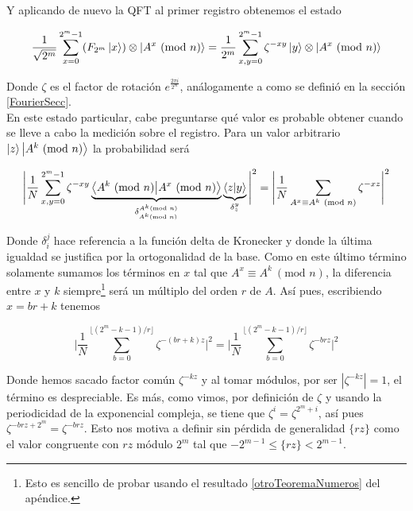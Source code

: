 \documentclass[11pt, spanish]{report}
\numberwithin{equation}{section}
\numberwithin{defin}{section}
\begin{document}
Y aplicando de nuevo la QFT al primer registro obtenemos el estado

\begin{equation}
\frac{1}{\sqrt{2^m}}\sum_{x=0}^{2^m-1} (F_{2^m}\ket{x})\otimes\ket{A^x\ (\text{mod }n)}=\frac{1}{2^m}\sum_{x,y=0}^{2^m-1}\zeta^{-xy}\ket{y}\otimes\ket{A^x\ (\text{mod }n)}
\end{equation}

Donde $\zeta$ es el factor de rotación $e^{\frac{2\pi i}{2^m}}$, análogamente a como se definió en la sección \ref{FourierSecc}.\\

En este estado particular, cabe preguntarse qué valor es probable obtener cuando se lleve a cabo la medición sobre el registro. Para un valor arbitrario $\ket{z}\ket{A^k\ (\text{mod }n)}$ la probabilidad será\footnotemark{}


\begin{equation}
\begin{split}
\Bigg|\frac{1}{N}\sum_{x,y=0}^{2^m-1}\zeta^{-xy}\underbrace{\bra{A^k\ (\text{mod }n)}\ket{A^x\ (\text{mod }n)}}_{\delta_{A^k (\text{mod }n)}^{A^k (\text{mod }n)}}\underbrace{\bra{z}\ket{y}}_{\delta_z^y}\Bigg|^2=\Bigg|\frac{1}{N}\sum_{A^x\equiv A^k\ (\text{mod }n)}\zeta^{-xz}\Bigg|^2
\end{split}
\end{equation}

Donde $\delta_i^j$ hace referencia a la función delta de Kronecker y donde la última igualdad se justifica por la ortogonalidad de la base. Como en este último término solamente sumamos los términos en $x$ tal que $A^x\equiv A^k\ (\text{mod }n)$, la  diferencia entre $x$ y $k$ siempre\footnote{Esto es sencillo de probar usando el resultado \ref{otroTeoremaNumeros} del apéndice.} será un múltiplo del orden $r$ de $A$. Así pues, escribiendo $x=br+k$ tenemos

\begin{equation}
\Bigg|\frac{1}{N}\sum_{b=0}^{\lfloor (2^m-k-1)/r \rfloor}\zeta^{-(br+k)z}\Bigg|^2=\Bigg|\frac{1}{N}\sum_{b=0}^{\lfloor (2^m-k-1)/r \rfloor}\zeta^{-brz}\Bigg|^2
\end{equation}

Donde hemos sacado factor común $\zeta^{-kz}$ y al tomar módulos, por ser $|\zeta^{-kz}|=1$, el término es despreciable. Es más, como vimos, por definición de $\zeta$ y usando la periodicidad de la exponencial compleja, se tiene que $\zeta^i=\zeta^{2^m+i}$, así pues $\zeta^{-brz+2^m}=\zeta^{-brz}$. Esto nos motiva a definir sin pérdida de generalidad $\{rz\}$ como el valor congruente con $rz$ módulo $2^m$ tal que $-2^{m-1}\leq\{rz\}<2^{m-1}$.\\
\end{document}
